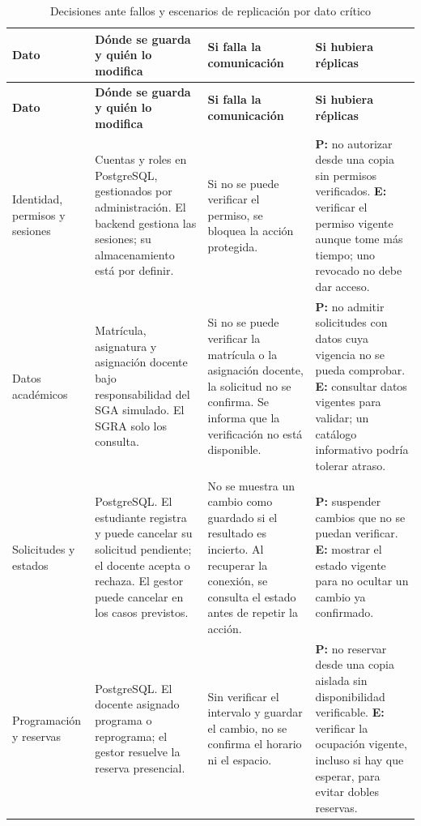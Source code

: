 \begin{longtable}{@{}>{\raggedright\arraybackslash}p{}>{\raggedright\arraybackslash}p{}>{\raggedright\arraybackslash}p{}>{\raggedright\arraybackslash}p{}@{}}
\caption{Decisiones ante fallos y escenarios de replicación por dato crítico}\label{tab:cap-datos}\\
\toprule
\textbf{Dato} & \textbf{Dónde se guarda y quién lo modifica} & \textbf{Si falla la comunicación} & \textbf{Si hubiera réplicas}\\
\midrule
\endfirsthead
\toprule
\textbf{Dato} & \textbf{Dónde se guarda y quién lo modifica} & \textbf{Si falla la comunicación} & \textbf{Si hubiera réplicas}\\
\midrule
\endhead
\bottomrule
\endlastfoot

Identidad, permisos y sesiones &
Cuentas y roles en PostgreSQL, gestionados por administración. El backend gestiona las sesiones; su almacenamiento está por definir. &
Si no se puede verificar el permiso, se bloquea la acción protegida. &
\textbf{P:} no autorizar desde una copia sin permisos verificados.
\textbf{E:} verificar el permiso vigente aunque tome más tiempo; uno revocado no debe dar acceso. \\

Datos académicos &
Matrícula, asignatura y asignación docente bajo responsabilidad del SGA simulado. El SGRA solo los consulta. &
Si no se puede verificar la matrícula o la asignación docente, la solicitud no se confirma. Se informa que la verificación no está disponible. &
\textbf{P:} no admitir solicitudes con datos cuya vigencia no se pueda comprobar.
\textbf{E:} consultar datos vigentes para validar; un catálogo informativo podría tolerar atraso. \\

Solicitudes y estados &
PostgreSQL. El estudiante registra y puede cancelar su solicitud pendiente; el docente acepta o rechaza. El gestor puede cancelar en los casos previstos. &
No se muestra un cambio como guardado si el resultado es incierto. Al recuperar la conexión, se consulta el estado antes de repetir la acción. &
\textbf{P:} suspender cambios que no se puedan verificar.
\textbf{E:} mostrar el estado vigente para no ocultar un cambio ya confirmado. \\

Programación y reservas &
PostgreSQL. El docente asignado programa o reprograma; el gestor resuelve la reserva presencial. &
Sin verificar el intervalo y guardar el cambio, no se confirma el horario ni el espacio. &
\textbf{P:} no reservar desde una copia aislada sin disponibilidad verificable.
\textbf{E:} verificar la ocupación vigente, incluso si hay que esperar, para evitar dobles reservas. \\


\end{longtable}
